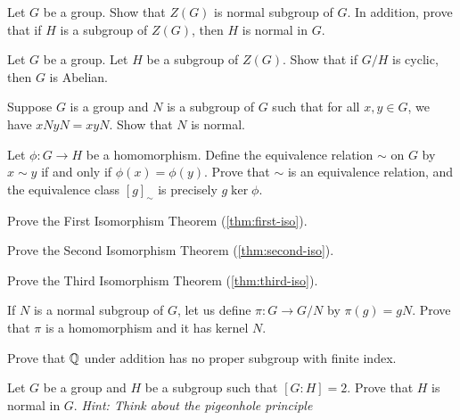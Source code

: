 \documentclass[./main.tex]{subfiles}
\begin{document}
\begin{exercise}
\label{ex:center-is-always-normal}
    Let $G$ be a group. Show that $Z(G)$ is normal subgroup of $G$. In addition,
    prove that if $H$ is a subgroup of $Z(G)$, then $H$ is normal in $G$.
\end{exercise}

\begin{exercise}
    Let $G$ be a group. Let $H$ be a subgroup of $Z(G)$. Show that if $G/H$ is
    cyclic, then $G$ is Abelian. 
\end{exercise}

\begin{exercise}
\label{ex:converse-of-quotient-groups-existence}
    Suppose $G$ is a group and $N$ is a subgroup of $G$ such that for all $x, y
    \in G$, we have $xN yN = xyN$. Show that $N$ is normal.
\end{exercise}

\begin{exercise}
\label{ex:homomorphism-induces-equiv-relation}
    Let $\phi: G \to H$ be a homomorphism. Define the equivalence relation
    $\sim$ on $G$ by $x \sim y$ if and only if $\phi(x) = \phi(y)$. Prove that $\sim$
    is an equivalence relation, and the equivalence class $[g]_\sim$ is
    precisely $g\ker\phi$.
\end{exercise}

\begin{exercise}
\label{ex:prove-first-iso}
    Prove the First Isomorphism Theorem (\cref{thm:first-iso}).
\end{exercise}

\begin{exercise}
\label{ex:prove-second-iso}
    Prove the Second Isomorphism Theorem (\cref{thm:second-iso}).
\end{exercise}

\begin{exercise}
\label{ex:prove-third-iso}
    Prove the Third Isomorphism Theorem (\cref{thm:third-iso}).
\end{exercise}

\begin{exercise}
\label{ex:kernel-of-projection}
    If $N$ is a normal subgroup of $G$, let us define $\pi: G \to G/N$ by
    $\pi(g) = gN$. Prove that $\pi$ is a homomorphism and it has kernel $N$.
\end{exercise}

\begin{exercise}
    Prove that $\mathbb{Q}$ under addition has no proper subgroup with finite index.
\end{exercise}

\begin{exercise}
\label{ex:index-2-subgroups-normal}
    Let $G$ be a group and $H$ be a subgroup such that $[G:H] = 2$. Prove that
    $H$ is normal in $G$. \textit{Hint: Think about the pigeonhole principle}
\end{exercise}
\end{document}
